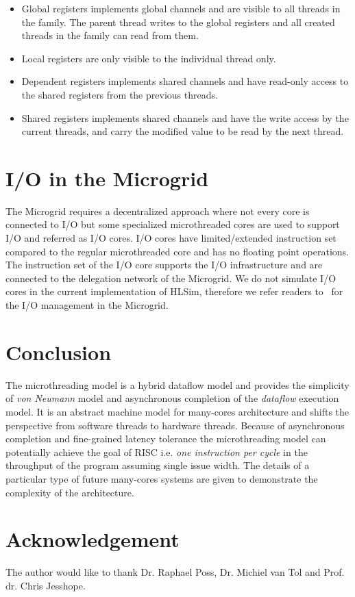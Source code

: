 \documentclass{article}
\begin{document}
\begin{itemize}

\item Global registers implements global channels and are visible to all
    threads in the family. The parent thread writes to the global registers and
    all created threads in the family can read from them.

\item Local registers are only visible to the individual thread only.

\item Dependent registers implements shared channels and have read-only access
    to the shared registers from the previous threads.

\item Shared registers implements shared channels and have the write access by
    the current threads, and carry the modified value to be read by the next
    thread.

\end{itemize}

\section{I/O in the Microgrid}
\label{sn:io_microgrid}

The Microgrid requires a decentralized approach where not every core is
connected to I/O but some specialized microthreaded cores are used to support
I/O and referred as I/O cores. I/O cores have limited/extended instruction
set~\cite{mgsim14} compared to the regular microthreaded core and has no
floating point operations. The instruction set of the I/O core supports the I/O
infrastructure and are connected to the delegation network of the Microgrid. We
do not simulate I/O cores in the current implementation of HLSim, therefore we
refer readers to~\cite{hicks09-io,poss.12,poss.12.rapido} for the I/O
management in the Microgrid.

\section{Conclusion}
\label{sn:conclusion}

The microthreading model is a hybrid dataflow model and provides the simplicity
of \emph{von Neumann} model and asynchronous completion of the \emph{dataflow}
execution model. It is an abstract machine model for many-cores architecture
and shifts the perspective from software threads to hardware threads. Because
of asynchronous completion and fine-grained latency tolerance the
microthreading model can potentially achieve the goal of RISC i.e. \emph{one
instruction per cycle} in the throughput of the program assuming single issue
width. The details of a particular type of future many-cores systems are given
to demonstrate the complexity of the architecture. 

\section*{Acknowledgement}
The author would like to thank Dr. Raphael Poss, Dr. Michiel van Tol and Prof.
dr. Chris Jesshope.











\end{document}
